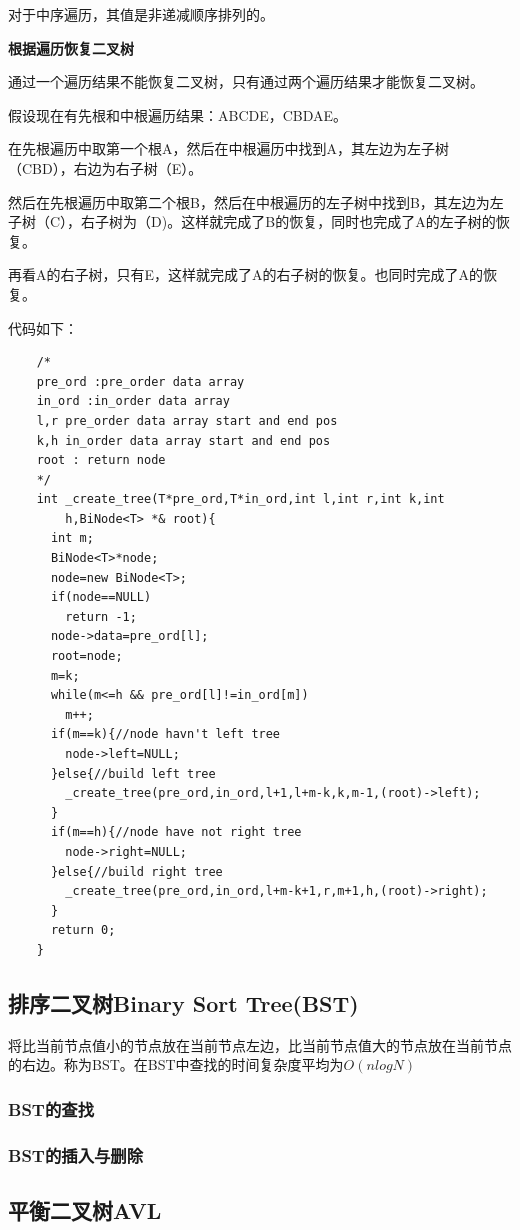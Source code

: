 \documentclass{article}
\begin{document}
		对于中序遍历，其值是非递减顺序排列的。


		\textbf{根据遍历恢复二叉树}

		通过一个遍历结果不能恢复二叉树，只有通过两个遍历结果才能恢复二叉树。

		假设现在有先根和中根遍历结果：ABCDE，CBDAE。

		在先根遍历中取第一个根A，然后在中根遍历中找到A，其左边为左子树（CBD），右边为右子树（E）。

		然后在先根遍历中取第二个根B，然后在中根遍历的左子树中找到B，其左边为左子树（C），右子树为（D)。这样就完成了B的恢复，同时也完成了A的左子树的恢复。

		再看A的右子树，只有E，这样就完成了A的右子树的恢复。也同时完成了A的恢复。
		
		代码如下：
		\begin{verbatim}
    /*
    pre_ord :pre_order data array
    in_ord :in_order data array
    l,r pre_order data array start and end pos
    k,h in_order data array start and end pos
    root : return node
    */
    int _create_tree(T*pre_ord,T*in_ord,int l,int r,int k,int
        h,BiNode<T> *& root){
      int m;
      BiNode<T>*node;
      node=new BiNode<T>;
      if(node==NULL)
        return -1;
      node->data=pre_ord[l];
      root=node;
      m=k;
      while(m<=h && pre_ord[l]!=in_ord[m])
        m++;
      if(m==k){//node havn't left tree
        node->left=NULL;
      }else{//build left tree
        _create_tree(pre_ord,in_ord,l+1,l+m-k,k,m-1,(root)->left);
      }
      if(m==h){//node have not right tree
        node->right=NULL;
      }else{//build right tree
        _create_tree(pre_ord,in_ord,l+m-k+1,r,m+1,h,(root)->right);
      }
      return 0;
    }
		\end{verbatim}
	\subsection{排序二叉树Binary Sort Tree(BST)}
		将比当前节点值小的节点放在当前节点左边，比当前节点值大的节点放在当前节点的右边。称为BST。在BST中查找的时间复杂度平均为$O(nlogN)$
		\subsubsection{BST的查找}
		\subsubsection{BST的插入与删除}
	\subsection{平衡二叉树AVL}
\end{document}
